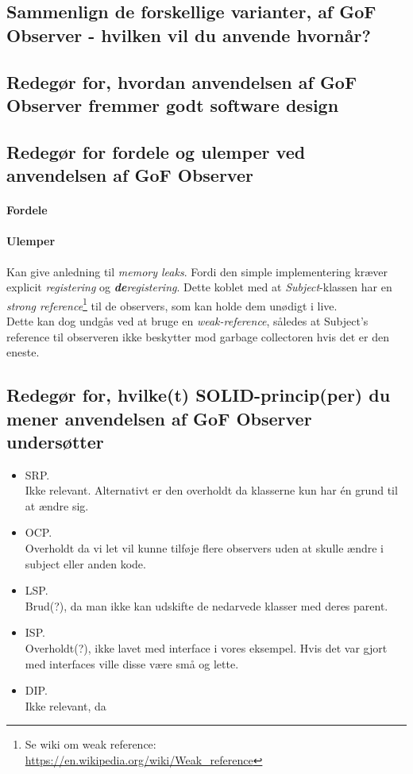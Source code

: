 \subsection{Sammenlign de forskellige varianter, af GoF Observer - hvilken vil du anvende hvornår?}

\subsection{Redegør for, hvordan anvendelsen af GoF Observer fremmer godt software design}

\subsection{Redegør for fordele og ulemper ved anvendelsen af GoF Observer}

\paragraph{Fordele}


\paragraph{Ulemper}
Kan give anledning til \textit{memory leaks}. Fordi den simple implementering kræver explicit \textit{registering} og \textit{\textbf{de}registering}. Dette koblet med at \textit{Subject}-klassen har en \textit{strong reference}\footnote{Se wiki om weak reference:\\ \url{https://en.wikipedia.org/wiki/Weak_reference}} til de observers, som kan holde dem unødigt i live.\\
Dette kan dog undgås ved at bruge en \textit{weak-reference}, således at Subject's reference til observeren ikke beskytter mod garbage collectoren hvis det er den eneste.

\subsection{Redegør for, hvilke(t) SOLID-princip(per) du mener anvendelsen af GoF Observer undersøtter}

\begin{itemize}
	\item SRP.\\
	Ikke relevant. Alternativt er den overholdt da klasserne kun har én grund til at ændre sig.
	\item OCP.\\
	Overholdt da vi let vil kunne tilføje flere observers uden at skulle ændre i subject eller anden kode.
	\item LSP.\\
	Brud(?), da man ikke kan udskifte de nedarvede klasser med deres parent.
	\item ISP.\\
	Overholdt(?), ikke lavet med interface i vores eksempel. Hvis det var gjort med interfaces ville disse være små og lette. 
	\item DIP.\\
	Ikke relevant, da 
\end{itemize}